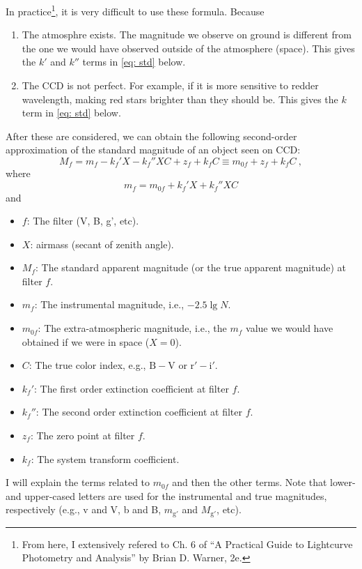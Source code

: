In practice\footnote{From here, I extensively refered to Ch. 6 of ``A Practical Guide to Lightcurve Photometry and Analysis'' by Brian D. Warner, 2e.}, it is very difficult to use these formula. Because
\begin{enumerate}
\item The atmosphre exists. The magnitude we observe on ground is different from the one we would have observed outside of the atmosphere (space). This gives the $ k' $ and $ k'' $ terms in \cref{eq: std} below.
\item The CCD is not perfect. For example, if it is more sensitive to redder wavelength, making red stars brighter than they should be. This gives the $ k $ term in \cref{eq: std} below.
\end{enumerate}
After these are considered, we can obtain the following second-order approximation of the standard magnitude of an object seen on CCD:
\begin{equation}\label{eq: std}
  M_f = m_f - k_f' X - k_f''XC + z_f + k_f C \equiv m_{0f} + z_f + k_f C ~,
\end{equation}
where
\begin{equation}
  m_{f} = m_{0f} + k_f'X + k_f'' XC
\end{equation}
and
\begin{itemize}
\item $ f $: The filter (V, B, g', etc).
\item $ X $: airmass (secant of zenith angle).
\item $ M_f $: The standard apparent magnitude (or the true apparent magnitude) at filter $ f $.
\item $ m_f $: The instrumental magnitude, i.e., $ -2.5 \lg N $.
\item $ m_{0f} $: The extra-atmospheric magnitude, i.e., the $ m_f $ value we would have obtained if we were in space ($ X = 0 $).
\item $ C $: The true color index, e.g., $ \mathrm{B} - \mathrm{V} $ or $ \mathrm{r'} - \mathrm{i'} $.
\item $ k_f' $: The first order extinction coefficient at filter $ f $.
\item $ k_f'' $: The second order extinction coefficient at filter $ f $.
\item $ z_f $: The zero point at filter $ f $.
\item $ k_f $: The system transform coefficient.
\end{itemize}
I will explain the terms related to $ m_{0f} $ and then the other terms. Note that lower- and upper-cased letters are used for the instrumental and true magnitudes, respectively (e.g., v and V, b and B, $ m_\mathrm{g'} $ and $ M_\mathrm{g'} $, etc).

